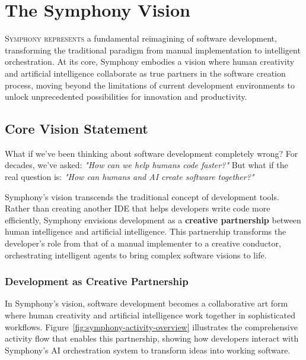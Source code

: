 
\section{The Symphony Vision}
\label{sec:symphony-vision}

\lettrine{S}{ymphony represents} a fundamental reimagining of software development, transforming the traditional paradigm from manual implementation to intelligent orchestration. At its core, Symphony embodies a vision where human creativity and artificial intelligence collaborate as true partners in the software creation process, moving beyond the limitations of current development environments to unlock unprecedented possibilities for innovation and productivity.

\subsection{Core Vision Statement}
\label{subsec:core-vision-statement}

\begin{infobox}[title=The Fundamental Question]
What if we've been thinking about software development completely wrong? For decades, we've asked: \textit{"How can we help humans code faster?"} But what if the real question is: \textit{"How can humans and AI create software together?"}
\end{infobox}

Symphony's vision transcends the traditional concept of development tools. Rather than creating another IDE that helps developers write code more efficiently, Symphony envisions development as a \textbf{creative partnership} between human intelligence and artificial intelligence. This partnership transforms the developer's role from that of a manual implementer to a creative conductor, orchestrating intelligent agents to bring complex software visions to life.

\subsubsection{Development as Creative Partnership}

In Symphony's vision, software development becomes a collaborative art form where human creativity and artificial intelligence work together in sophisticated workflows. Figure~\ref{fig:symphony-activity-overview} illustrates the comprehensive activity flow that enables this partnership, showing how developers interact with Symphony's AI orchestration system to transform ideas into working software.

